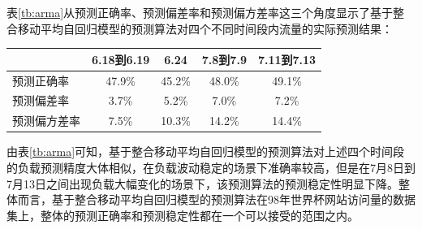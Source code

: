 表\ref{tb:arma}从预测正确率、预测偏差率和预测偏方差率这三个角度显示了基于整合移动平均自回归模型的预测算法对四个不同时间段内流量的实际预测结果：
\begin{table}[h]
\centering
{}
\begin{tabular}{@{}lcccc@{}}\toprule
  & 6.18到6.19 & 6.24 & 7.8到7.9 & 7.11到7.13 \\ \midrule
 预测正确率 & 47.9\% & 45.2\% & 48.0\% & 49.1\% \\
 预测偏差率 & 3.7\% & 5.2\% & 7.0\% & 7.2\% \\
 预测偏方差率 & 7.5\% & 10.3\% & 14.2\% & 14.4\% \\ \bottomrule
\end{tabular}
\end{table}

由表\ref{tb:arma}可知，基于整合移动平均自回归模型的预测算法对上述四个时间段的负载预测精度大体相似，在负载波动稳定的场景下准确率较高，但是在7月8日到7月13日之间出现负载大幅变化的场景下，该预测算法的预测稳定性明显下降。整体而言，基于整合移动平均自回归模型的预测算法在98年世界杯网站访问量的数据集上，整体的预测正确率和预测稳定性都在一个可以接受的范围之内。

